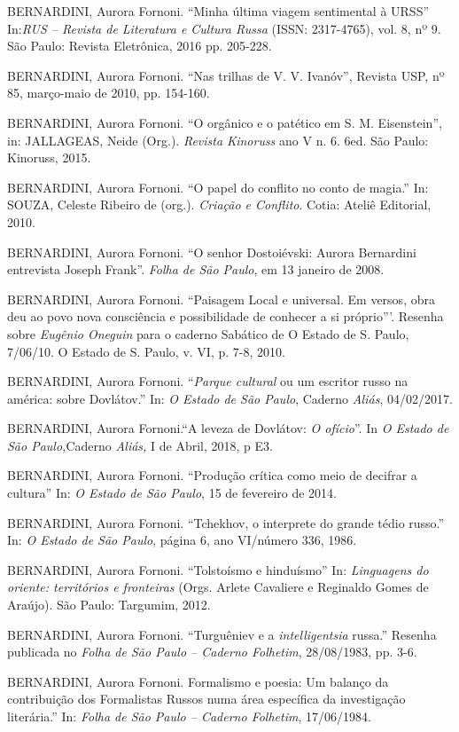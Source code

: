 BERNARDINI, Aurora Fornoni. ``Minha última viagem sentimental à URSS''
In:\emph{RUS -- Revista de Literatura e Cultura Russa} (ISSN:
2317-4765), vol. 8, nº 9. São Paulo: Revista Eletrônica, 2016 pp.
205-228.

BERNARDINI, Aurora Fornoni. ``Nas trilhas de V. V. Ivanóv'', Revista
USP, nº 85, março-maio de 2010, pp. 154-160.

BERNARDINI, Aurora Fornoni. ``O orgânico e o patético em S. M.
Eisenstein'', in: JALLAGEAS, Neide (Org.). \emph{Revista Kinoruss} ano V
n. 6. 6ed. São Paulo: Kinoruss, 2015.

BERNARDINI, Aurora Fornoni. ``O papel do conflito no conto de magia.''
In: SOUZA, Celeste Ribeiro de (org.). \emph{Criação e Conflito}. Cotia:
Ateliê Editorial, 2010.

BERNARDINI, Aurora Fornoni. ``O senhor Dostoiévski: Aurora Bernardini
entrevista Joseph Frank''. \emph{Folha de São Paulo}, em 13 janeiro de
2008.

BERNARDINI, Aurora Fornoni. ``Paisagem Local e universal. Em versos,
obra deu ao povo nova consciência e possibilidade de conhecer a si
próprio'''. Resenha sobre \emph{Eugênio Oneguin} para o caderno Sabático
de O Estado de S. Paulo, 7/06/10. O Estado de S. Paulo, v. VI, p. 7-8,
2010.

BERNARDINI, Aurora Fornoni. ``\emph{Parque cultural} ou um escritor
russo na américa: sobre Dovlátov.'' In: \emph{O Estado de São Paulo},
Caderno \emph{Aliás}, 04/02/2017.

BERNARDINI, Aurora Fornoni.``A leveza de Dovlátov: \emph{O ofício}''. In
\emph{O Estado de São Paulo,}Caderno \emph{Aliás,} I de Abril, 2018, p
E3.

BERNARDINI, Aurora Fornoni. ``Produção crítica como meio de decifrar a
cultura'' In: \emph{O Estado de São Paulo}, 15 de fevereiro de 2014.

BERNARDINI, Aurora Fornoni. ``Tchekhov, o interprete do grande tédio
russo.'' In: \emph{O Estado de São Paulo}, página 6, ano VI/número 336,
1986.

BERNARDINI, Aurora Fornoni. ``Tolstoísmo e hinduísmo'' In:
\emph{Linguagens do oriente: territórios e fronteiras} (Orgs. Arlete
Cavaliere e Reginaldo Gomes de Araújo). São Paulo: Targumim, 2012.

BERNARDINI, Aurora Fornoni. ``Turguêniev e a \emph{intelligentsia}
russa.'' Resenha publicada no \emph{Folha de São Paulo -- Caderno
Folhetim}, 28/08/1983, pp. 3-6.

BERNARDINI, Aurora Fornoni. Formalismo e poesia: Um balanço da
contribuição dos Formalistas Russos numa área específica da investigação
literária.'' In: \emph{Folha de São Paulo -- Caderno Folhetim},
17/06/1984.

